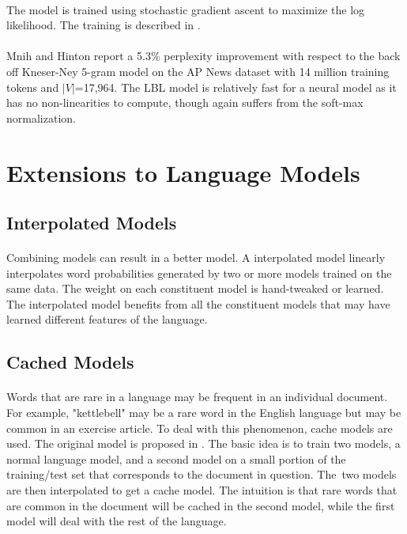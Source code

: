 \paragraph{}
The model is trained using stochastic gradient ascent to maximize the log likelihood. The training is described in \cite{MnihHinton2007}.
\paragraph{}
Mnih and Hinton report a 5.3\% perplexity improvement with respect to the back off Kneser-Ney 5-gram model on the AP News dataset with 14 million training tokens and $|V|$=17,964. The LBL model is relatively fast for a neural model as it has no non-linearities to compute, though again suffers from the soft-max normalization. 

\section {Extensions to Language Models}
\subsection{Interpolated Models}
\paragraph{}
Combining models can result in a better model. A interpolated model linearly interpolates word probabilities generated by two or more models trained on the same data. The weight on each constituent model is hand-tweaked or learned. The interpolated model benefits from all the constituent models that may have learned different features of the language.
\subsection{Cached Models}
\paragraph{}
Words that are rare in a language may be frequent in an individual document. For example, "kettlebell" may be a rare word in the English language but may be common in an exercise article. To deal with this phenomenon, cache models are used. The original model is proposed in \cite{Kuhn1990}. The basic idea is to train two models, a normal language model, and a second model on a small portion of the training/test set that corresponds to the document in question. The~two models are then interpolated to get a cache model. The intuition is that rare words that are common in the document will be cached in the second model, while the first model will deal with the rest of the language.

